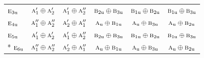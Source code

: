 \documentclass[10pt,a4paper]{article}
\numberwithin{equation}{section}
\newcommand{\irr}[1]{\text{\normalfont\scshape #1}}
\newcommand{\ptag}[1]{\mathrm{#1}}
\begin{document}
{\begin{longtable}{@{}lccccc@{}}
$\irr{e}_{3\ptag{u}}$ & $\irr{a}_{1}'\oplus \irr{a}_{2}'$ & $\irr{a}_{1}'\oplus \irr{a}_{2}''$ & $\irr{b}_{2\ptag{u}}\oplus \irr{b}_{3\ptag{u}}$ & $\irr{b}_{1\ptag{u}}\oplus \irr{b}_{2\ptag{u}}$ & $\irr{b}_{1\ptag{u}}\oplus \irr{b}_{3\ptag{u}}$\\
$\irr{e}_{4\ptag{u}}$ & $\irr{a}_{1}''\oplus \irr{a}_{2}''$ & $\irr{a}_{2}'\oplus \irr{a}_{1}''$ & $\irr{a}_{\ptag{u}}\oplus \irr{b}_{1\ptag{u}}$ & $\irr{a}_{\ptag{u}}\oplus \irr{b}_{3\ptag{u}}$ & $\irr{a}_{\ptag{u}}\oplus \irr{b}_{2\ptag{u}}$\\
$\irr{e}_{5\ptag{u}}$ & $\irr{a}_{1}'\oplus \irr{a}_{2}'$ & $\irr{a}_{1}'\oplus \irr{a}_{2}''$ & $\irr{b}_{2\ptag{u}}\oplus \irr{b}_{3\ptag{u}}$ & $\irr{b}_{1\ptag{u}}\oplus \irr{b}_{2\ptag{u}}$ & $\irr{b}_{1\ptag{u}}\oplus \irr{b}_{3\ptag{u}}$\\*
$\irr{e}_{6\ptag{u}}$ & $\irr{a}_{1}''\oplus \irr{a}_{2}''$ & $\irr{a}_{2}'\oplus \irr{a}_{1}''$ & $\irr{a}_{\ptag{u}}\oplus \irr{b}_{1\ptag{u}}$ & $\irr{a}_{\ptag{u}}\oplus \irr{b}_{3\ptag{u}}$ & $\irr{a}_{\ptag{u}}\oplus \irr{b}_{2\ptag{u}}$\\
\bottomrule\end{longtable}}
\end{document}

